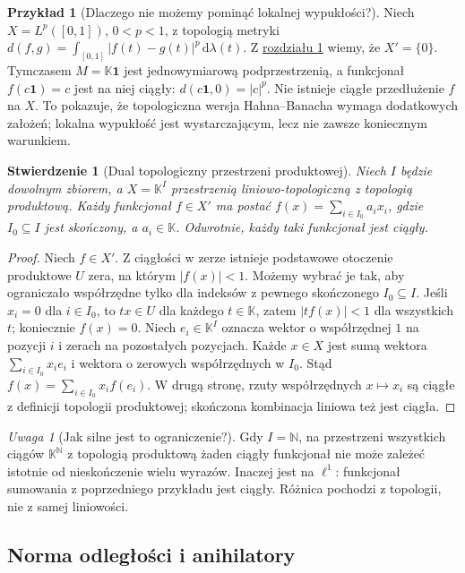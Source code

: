 \documentclass[11pt,a4paper]{article}
\numberwithin{equation}{section}
\theoremstyle{plain}
\newtheorem{stwierdzenie}[twierdzenie]{Stwierdzenie}
\theoremstyle{definition}
\newtheorem{przyklad}[twierdzenie]{Przykład}
\theoremstyle{remark}
\newtheorem{uwaga}[twierdzenie]{Uwaga}
\newcommand{\N}{\mathbb N}
\newcommand{\K}{\mathbb K}
\begin{document}
\begin{przyklad}[Dlaczego nie możemy pominąć lokalnej wypukłości?]
Niech $X=L^p([0,1])$, $0<p<1$, z topologią metryki
$d(f,g)=\int_{[0,1]}|f(t)-g(t)|^p\,\mathrm d\lambda(t)$.
Z \hyperref[sec:tvs]{rozdziału 1} wiemy, że $X'=\{0\}$.
Tymczasem $M=\K\mathbf 1$ jest jednowymiarową
podprzestrzenią, a funkcjonał $f(c\mathbf1)=c$
jest na niej ciągły: $d(c\mathbf1,0)=|c|^p$.
Nie istnieje ciągłe przedłużenie $f$ na $X$.
To pokazuje, że topologiczna wersja Hahna--Banacha
wymaga dodatkowych założeń; lokalna wypukłość jest
wystarczającym, lecz nie zawsze koniecznym warunkiem.
\end{przyklad}

\begin{stwierdzenie}[Dual topologiczny przestrzeni produktowej]
\label{prop:product-dual}
Niech $I$ będzie dowolnym zbiorem, a $X=\K^I$
przestrzenią liniowo-topologiczną z topologią produktową.
Każdy funkcjonał $f\in X'$ ma postać
$f(x)=\sum_{i\in I_0}a_i x_i$, gdzie $I_0\subseteq I$
jest skończony, a $a_i\in\K$. Odwrotnie, każdy taki
funkcjonał jest ciągły.
\end{stwierdzenie}
\begin{proof}
Niech $f\in X'$. Z ciągłości w zerze istnieje
podstawowe otoczenie produktowe $U$ zera, na którym
$|f(x)|<1$. Możemy wybrać je tak, aby ograniczało
współrzędne tylko dla indeksów z pewnego skończonego
$I_0\subseteq I$. Jeśli $x_i=0$ dla $i\in I_0$,
to $tx\in U$ dla każdego $t\in\K$, zatem
$|t f(x)|<1$ dla wszystkich $t$; koniecznie $f(x)=0$.
Niech $e_i\in\K^I$ oznacza wektor o współrzędnej
$1$ na pozycji $i$ i zerach na pozostałych pozycjach.
Każde $x\in X$ jest sumą wektora
$\sum_{i\in I_0}x_i e_i$ i wektora o zerowych
współrzędnych w $I_0$. Stąd
$f(x)=\sum_{i\in I_0}x_i f(e_i)$.
W drugą stronę, rzuty współrzędnych $x\mapsto x_i$
są ciągłe z definicji topologii produktowej;
skończona kombinacja liniowa też jest ciągła.
\end{proof}

\begin{uwaga}[Jak silne jest to ograniczenie?]
Gdy $I=\N$, na przestrzeni wszystkich ciągów
$\K^\N$ z topologią produktową żaden ciągły funkcjonał
nie może zależeć istotnie od nieskończenie wielu wyrazów.
Inaczej jest na $\ell^1$: funkcjonał sumowania z
poprzedniego przykładu jest ciągły.
Różnica pochodzi z topologii, nie z samej liniowości.
\end{uwaga}

\subsection{Norma odległości i anihilatory}
\end{document}
